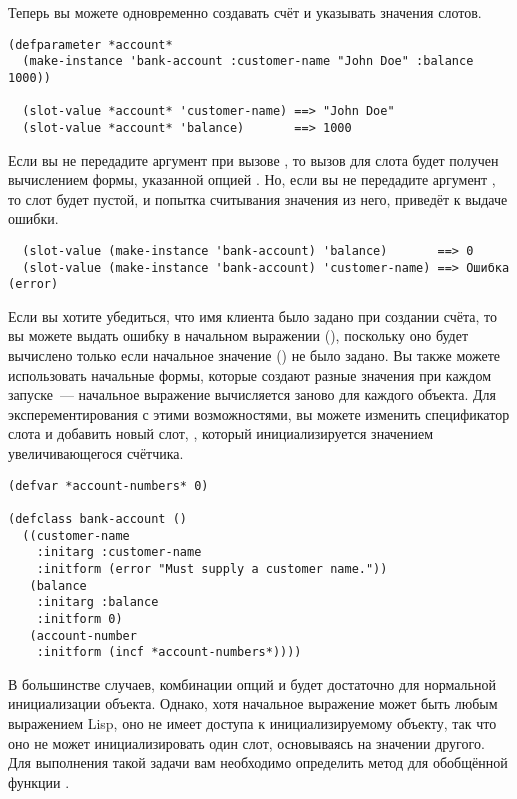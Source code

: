 Теперь вы можете одновременно создавать счёт и указывать значения слотов.

\begin{lstlisting}
(defparameter *account*
  (make-instance 'bank-account :customer-name "John Doe" :balance 1000))

  (slot-value *account* 'customer-name) ==> "John Doe"
  (slot-value *account* 'balance)       ==> 1000
\end{lstlisting}

Если вы не передадите аргумент  при вызове , то вызов
 для слота  будет получен вычислением формы, указанной
опцией .  Но, если вы не передадите аргумент , то
слот  будет пустой, и попытка считывания значения из него, приведёт к
выдаче ошибки.

\begin{verbatim}
  (slot-value (make-instance 'bank-account) 'balance)       ==> 0
  (slot-value (make-instance 'bank-account) 'customer-name) ==> Ошибка (error)
\end{verbatim}

Если вы хотите убедиться, что имя клиента было задано при создании счёта, то вы можете
выдать ошибку в начальном выражении (), поскольку оно будет вычислено
только если начальное значение () не было задано.  Вы также можете
использовать начальные формы, которые создают разные значения при каждом запуске~---
начальное выражение вычисляется заново для каждого объекта.  Для эксперементирования с
этими возможностями, вы можете изменить спецификатор слота  и добавить
новый слот, , который инициализируется значением увеличивающегося
счётчика.

\begin{lstlisting}
(defvar *account-numbers* 0)

(defclass bank-account ()
  ((customer-name
    :initarg :customer-name
    :initform (error "Must supply a customer name."))
   (balance
    :initarg :balance
    :initform 0)
   (account-number
    :initform (incf *account-numbers*))))
\end{lstlisting}

В большинстве случаев, комбинации опций  и  будет
достаточно для нормальной инициализации объекта.  Однако, хотя начальное выражение может
быть любым выражением Lisp, оно не имеет доступа к инициализируемому объекту, так что оно
не может инициализировать один слот, основываясь на значении другого.  Для выполнения
такой задачи вам необходимо определить метод для обобщённой функции
.


